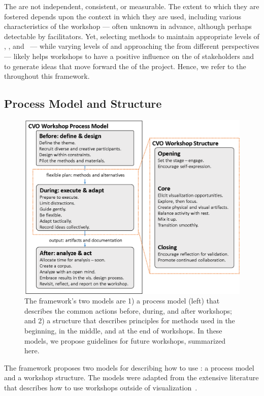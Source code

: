 The \tactics are not independent, consistent, or measurable. The extent to which they are fostered depends upon the context in which they are used, including various characteristics of the workshop --- often unknown in advance, although perhaps detectable by facilitators. Yet, selecting methods to maintain appropriate levels of \agency, \interest, and \trust ~--- while varying levels of \challenge and approaching the \topic from different perspectives --- likely helps workshops to have a positive influence on the \mindset of stakeholders and to generate ideas that move forward the \methodology of the project. Hence, we refer to the \tactics throughout this framework.

\subsection{Process Model and Structure}
\label{sec:process-and-structure}

\begin{figure}
\includegraphics[width=\columnwidth]{figures/final.png}
\caption{The framework's two models are 1) a process model (left) that describes the common actions before, during, and after workshops; and 2) a structure that describes principles for methods used in the beginning, in the middle, and at the end of workshops. In these models, we propose \numberOfGuidelines guidelines for future workshops, summarized here.}
\label{fig:framework-overview}
\end{figure}

The framework proposes two models for describing how to use \workshops: a process model and a workshop structure. The models were adapted from the extensive literature that describes how to use workshops outside of visualization~\cite{CreativeEducationFoundation2015,Brooks-Harris1999,DeBono1983,Dove2016,Gray2010,Hamilton2016,Osborn1953}. 

